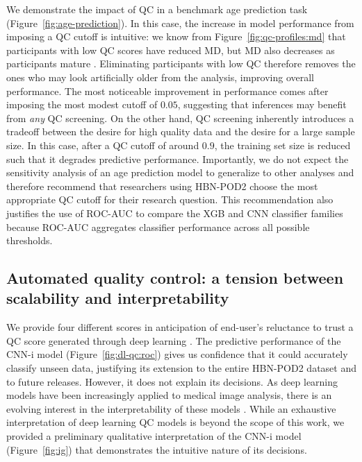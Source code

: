 \documentclass[9pt,lineno]{elife}
\begin{document}
We demonstrate the impact of QC in a benchmark age prediction task
(Figure~\ref{fig:age-prediction}). In this case, the increase in model performance
from imposing a QC cutoff is intuitive: we know from
Figure~\ref{fig:qc-profiles:md} that participants with low QC scores have
reduced MD, but MD also decreases as participants mature
\citep{yeatman2014lifespan,richie-halford2021multidimensional}. Eliminating
participants with low QC therefore removes the ones who may look artificially older
from the analysis, improving overall performance. The most noticeable
improvement in performance comes after imposing the most modest cutoff of
$0.05$, suggesting that inferences may benefit from \emph{any} QC screening. On
the other hand, QC screening inherently introduces a tradeoff between the desire
for high quality data and the desire for a large sample size. In this case,
after a QC cutoff of around $0.9$, the training set size is reduced such that it
degrades predictive performance. Importantly, we do not expect the sensitivity
analysis of an age prediction model to generalize to other analyses and therefore
recommend that researchers using HBN-POD2 choose the most appropriate QC cutoff for their research question.
This recommendation also justifies the use of ROC-AUC to compare the XGB and CNN classifier families because ROC-AUC aggregates classifier performance across all possible thresholds.

\subsection{Automated quality control: a tension between scalability and interpretability}

We provide four different scores in anticipation of end-user's reluctance to
trust a QC score generated through deep learning \citep{lipton2017doctor,
Zech2018-ki, Ghassemi2021-zg, salahuddin2022transparency}. The predictive
performance of the CNN-i model (Figure~\ref{fig:dl-qc:roc}) gives
us confidence that it could accurately classify unseen data, justifying its
extension to the entire HBN-POD2 dataset and to future releases. However, it
does not explain its decisions. As deep learning models have been increasingly
applied to medical image analysis, there is an evolving interest in the
interpretability of these models \citep{salahuddin2022transparency}. While an
exhaustive interpretation of deep learning QC models is beyond the scope of this
work, we provided a preliminary qualitative interpretation of the CNN-i model
(Figure~\ref{fig:ig}) that demonstrates the intuitive nature of its decisions.
\end{document}
